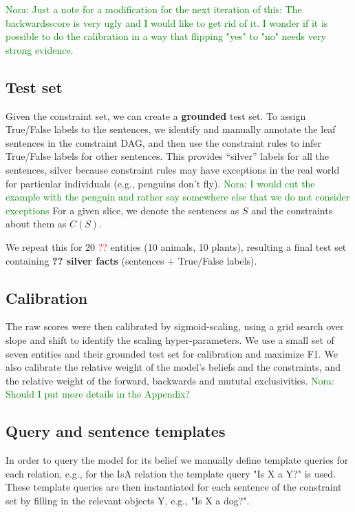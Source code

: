 \documentclass[11pt]{article}
\newcommand{\nk}[1]{\textcolor{green}{Nora: #1}}
\newcommand{\eat}[1]{}
\newcommand{\red}[1]{\textcolor{red}{#1}}
\begin{document}
\nk{Just a note for a modification for the next iteration of this: The backwardsscore is very ugly and I would like to get rid of it. I wonder if it is possible to do the calibration in a way that flipping "yes" to "no" needs very strong evidence.}


\subsection{Test set}
Given the constraint set, we can create a {\bf grounded} test set. \eat{by instantiating X with a particular entity, e.g., ``poodle'' (resulting in 200 
sentences and 13000 constraints about poodle).} 
To assign True/False labels to the
sentences, we identify and manually annotate the leaf sentences in the constraint DAG,
and then use the constraint rules to infer True/False labels for other sentences.
This provides ``silver'' labels for all the sentences, silver because constraint
rules may have exceptions in the real world for particular individuals (e.g.,
penguins don't fly). \nk{I would cut the example with the penguin and rather say somewhere else that we do not consider exceptions} For a given slice, we denote the sentences as $S$ and
the constraints about them as $C(S)$.

We repeat this for 20 \red{??} entities (10 animals, 10 plants), resulting
a final test set containing {\bf ?? silver facts} (sentences + True/False labels).
\eat{Note that each slice is independent and can be processed separately.
As described shortly, we perform our experiments with each slice in turn
and average results.}

\subsection{Calibration}
The raw scores were then calibrated by sigmoid-scaling, using a
grid search over slope and shift to identify the scaling hyper-parameters. We use a small set of seven entities and their grounded test set for calibration and maximize F1.   We also calibrate the relative weight of the model's beliefs and the constraints, and the relative weight of the forward, backwards and mututal exclusivities. \nk{Should I put more details in the Appendix?}

\subsection{Query and sentence templates}

In order to query the model for its belief we manually define template queries for each relation, e.g., for the IsA relation the template query "Is X a Y?" is used.
These template queries are then instantiated for each sentence of the constraint set by filling in the relevant objects Y, e.g., "Is X a dog?".
\end{document}
